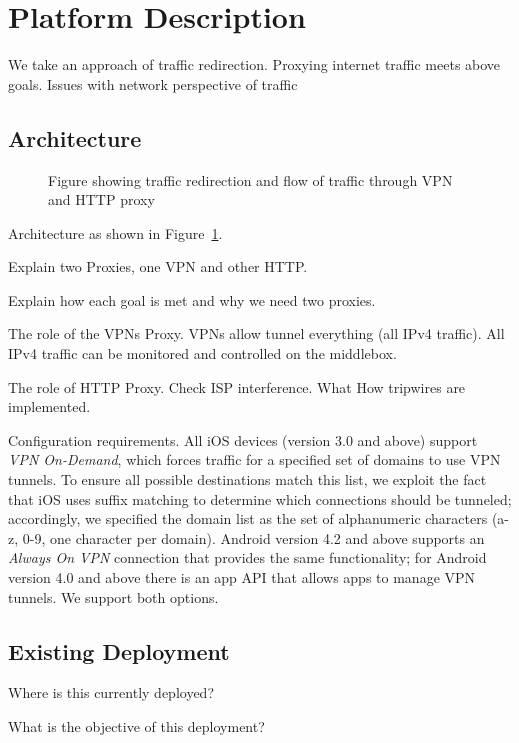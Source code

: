 \section{Platform Description}

We take an approach of traffic redirection.
Proxying internet traffic meets above goals. 
Issues with network perspective of traffic

\subsection{Architecture}


\begin{figure}
\caption{Figure showing traffic redirection and flow of traffic through VPN and HTTP proxy}
\label{fig:architecture}
\end{figure}

Architecture as shown in Figure~\ref{fig:architecture}.

Explain two Proxies, one VPN and other HTTP.

Explain how each goal is met and why we need two proxies. 

The role of the VPNs Proxy.
VPNs allow tunnel everything (all IPv4 traffic). 
All IPv4 traffic can be monitored and controlled on the middlebox. 

The role of HTTP Proxy.
Check ISP interference.
What 
How tripwires are implemented. 

Configuration requirements.
All iOS devices (version 3.0 and above) support \textit{VPN On-Demand}, which forces traffic for a specified set of domains to use VPN tunnels. 
To ensure all possible destinations match this list, we exploit the fact that iOS uses suffix matching to determine which connections should be tunneled; accordingly, we specified the domain list as the set of alphanumeric characters (a-z, 0-9, one character per domain). 
Android version 4.2 and above supports an \textit{Always On VPN} connection that provides the same functionality; for Android version 4.0 and above there is an app API that allows apps to manage VPN tunnels. 
We support both options.

\subsection{Existing Deployment}

Where is this currently deployed?

What is the objective of this deployment?

